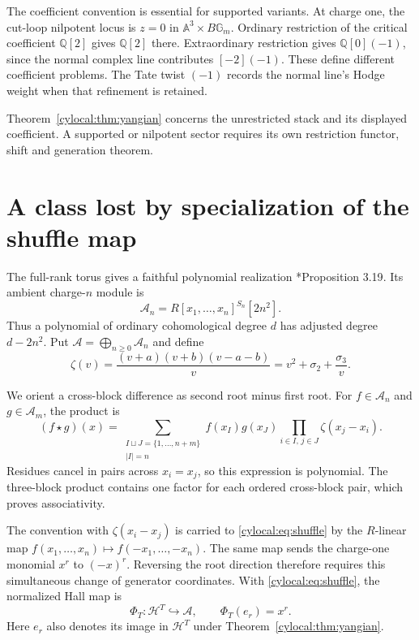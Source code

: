 The coefficient convention is essential for supported variants.
At charge one, the cut-loop nilpotent locus is $z=0$ in
$\mathbb A^3\times B\mathbb G_m$. Ordinary restriction of the critical
coefficient $\mathbb Q[2]$ gives $\mathbb Q[2]$ there. Extraordinary
restriction gives $\mathbb Q[0](-1)$, since the normal complex line
contributes $[-2](-1)$. These define different coefficient problems.
The Tate twist $(-1)$ records the normal line's Hodge weight when
that refinement is retained.

Theorem~\ref{cylocal:thm:yangian} concerns the unrestricted stack
and its displayed coefficient. A supported or nilpotent sector
requires its own restriction functor, shift and generation theorem.

\section{A class lost by specialization of the shuffle map}
\label{cylocal:sec:specialization}

The full-rank torus gives a faithful polynomial realization
\cite{cylocal:Davison}*{Proposition 3.19}. Its ambient charge-$n$
module is
\[
 \mathcal A_n=R[x_1,\ldots,x_n]^{S_n}[2n^2].
\]
Thus a polynomial of ordinary cohomological degree $d$ has adjusted
degree $d-2n^2$. Put $\mathcal A=\bigoplus_{n\geq0}\mathcal A_n$
and define
\[
 \zeta(v)=\frac{(v+a)(v+b)(v-a-b)}{v}
        =v^2+\sigma_2+\frac{\sigma_3}{v}.
\]

We orient a cross-block difference as second root minus first root.
For $f\in\mathcal A_n$ and $g\in\mathcal A_m$, the product is
\begin{equation}\label{cylocal:eq:shuffle}
 (f\star g)(x)=
 \sum_{\substack{I\sqcup J=\{1,\ldots,n+m\}\\|I|=n}}
 f(x_I)g(x_J)\prod_{i\in I,\,j\in J}\zeta(x_j-x_i).
\end{equation}
Residues cancel in pairs across $x_i=x_j$, so this expression is
polynomial. The three-block product contains one factor for each
ordered cross-block pair, which proves associativity.

The convention with $\zeta(x_i-x_j)$ is carried to
\eqref{cylocal:eq:shuffle} by the $R$-linear map
$f(x_1,\ldots,x_n)\mapsto f(-x_1,\ldots,-x_n)$.
The same map sends the charge-one monomial $x^r$ to $(-x)^r$.
Reversing the root direction therefore requires this simultaneous
change of generator coordinates. With \eqref{cylocal:eq:shuffle},
the normalized Hall map is
\begin{equation}\label{cylocal:eq:ambient-map}
 \Phi_T:\mathcal H^T\hookrightarrow\mathcal A,
 \qquad \Phi_T(e_r)=x^r.
\end{equation}
Here $e_r$ also denotes its image in $\mathcal H^T$ under
Theorem~\ref{cylocal:thm:yangian}.

